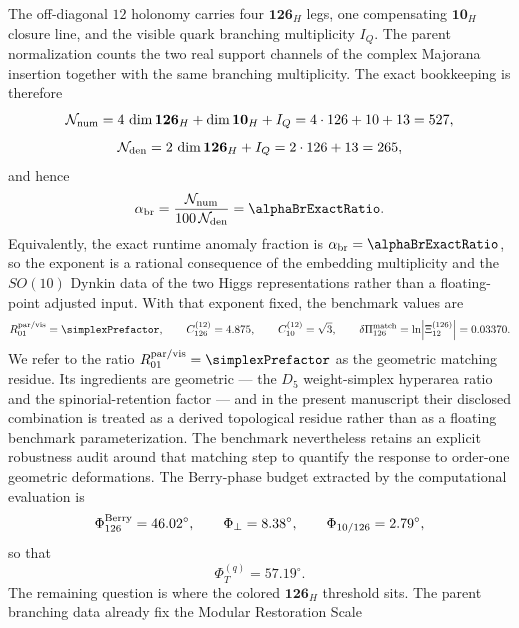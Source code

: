 \documentclass[11pt]{article}
\begin{document}
The off-diagonal $12$ holonomy carries four $\mathbf{126}_H$ legs, one compensating $\mathbf{10}_H$ closure line, and the visible quark branching multiplicity $I_Q$. The parent normalization counts the two real support channels of the complex Majorana insertion together with the same branching multiplicity. The exact bookkeeping is therefore
\begin{equation}
 \mathcal N_{\rm num}=4\,\dim\mathbf{126}_H+\dim\mathbf{10}_H+I_Q=4\cdot126+10+13=527,
\end{equation}
\begin{equation}
 \mathcal N_{\rm den}=2\,\dim\mathbf{126}_H+I_Q=2\cdot126+13=265,
\end{equation}
and hence
\begin{equation}
 \alpha_{\rm br}
 =
 \frac{\mathcal N_{\rm num}}{100\,\mathcal N_{\rm den}}
 =
 \alphaBrExactRatio.
\end{equation}
Equivalently, the exact runtime anomaly fraction is $\alpha_{\rm br}=\alphaBrExactRatio$, so the exponent is a rational consequence of the embedding multiplicity and the $SO(10)$ Dynkin data of the two Higgs representations rather than a floating-point adjusted input. With that exponent fixed, the benchmark values are
\begin{equation}
 R_{01}^{\rm par/vis}=\simplexPrefactor,
 \qquad
 C_{126}^{(12)}=4.875,
 \qquad
 C_{10}^{(12)}=\sqrt{3},
 \qquad
 \delta\Pi_{126}^{\rm match}=\ln\!\left|\Xi_{12}^{(126)}\right|=0.03370.
\end{equation}
We refer to the ratio $R_{01}^{\rm par/vis}=\simplexPrefactor$ as the geometric matching residue. Its ingredients are geometric --- the $D_5$ weight-simplex hyperarea ratio and the spinorial-retention factor --- and in the present manuscript their disclosed combination is treated as a derived topological residue rather than as a floating benchmark parameterization. The benchmark nevertheless retains an explicit robustness audit around that matching step to quantify the response to order-one geometric deformations.
The Berry-phase budget extracted by the computational evaluation is
\begin{equation}
 \Phi_{126}^{\rm Berry}=46.02^{\circ},
 \qquad
 \Phi_{\perp}=8.38^{\circ},
 \qquad
 \Phi_{10/126}=2.79^{\circ},
\end{equation}
so that
\begin{equation}
 \Phi_T^{(q)}=57.19^{\circ}.
\end{equation}
The remaining question is where the colored $\mathbf{126}_H$ threshold sits. The parent branching data already fix the Modular Restoration Scale
\end{document}
